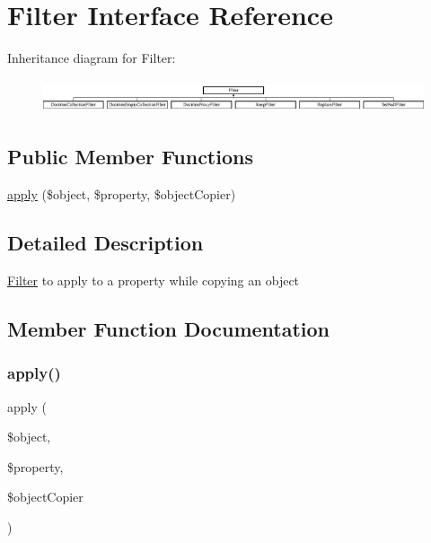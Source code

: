 \hypertarget{interface_deep_copy_1_1_filter_1_1_filter}{}\section{Filter Interface Reference}
\label{interface_deep_copy_1_1_filter_1_1_filter}
Inheritance diagram for Filter\+:\begin{figure}[H]
\begin{center}
\leavevmode
\includegraphics[height=0.998218cm]{interface_deep_copy_1_1_filter_1_1_filter}
\end{center}
\end{figure}
\subsection*{Public Member Functions}
\begin{DoxyCompactItemize}
\item 
\mbox{\hyperlink{interface_deep_copy_1_1_filter_1_1_filter_a360932fe7f9488472623d76aa7da2a25}{apply}} (\$object, \$property, \$object\+Copier)
\end{DoxyCompactItemize}


\subsection{Detailed Description}
\mbox{\hyperlink{interface_deep_copy_1_1_filter_1_1_filter}{Filter}} to apply to a property while copying an object 

\subsection{Member Function Documentation}
\mbox{\label{interface_deep_copy_1_1_filter_1_1_filter_a360932fe7f9488472623d76aa7da2a25}} 
\subsubsection{\texorpdfstring{apply()}{apply()}}
{\footnotesize\ttfamily apply (\begin{DoxyParamCaption}\item[{}]{\$object,  }\item[{}]{\$property,  }\item[{}]{\$object\+Copier }\end{DoxyParamCaption})}

